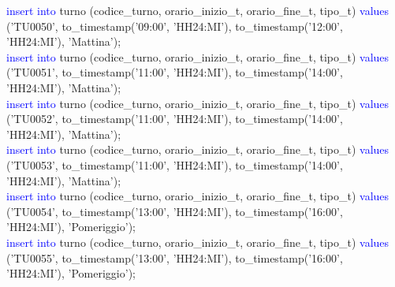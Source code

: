 \documentclass{article}
\begin{document}
\begin{flushleft}
{        \hspace*{0.5em}\textcolor{blue}{insert into} turno (codice\_turno, orario\_inizio\_t, orario\_fine\_t, tipo\_t) \textcolor{blue}{values} \hspace*{0.5em}('TU0050', to\_timestamp('09:00', 'HH24:MI'), to\_timestamp('12:00', 'HH24:MI'), \hspace*{0.5em}'Mattina'); \\
        \newpage
        \hspace*{0.5em}\textcolor{blue}{insert into} turno (codice\_turno, orario\_inizio\_t, orario\_fine\_t, tipo\_t) \textcolor{blue}{values} \hspace*{0.5em}('TU0051', to\_timestamp('11:00', 'HH24:MI'), to\_timestamp('14:00', 'HH24:MI'), \hspace*{0.5em}'Mattina'); \\
        \hspace*{0.5em}\textcolor{blue}{insert into} turno (codice\_turno, orario\_inizio\_t, orario\_fine\_t, tipo\_t) \textcolor{blue}{values} \hspace*{0.5em}('TU0052', to\_timestamp('11:00', 'HH24:MI'), to\_timestamp('14:00', 'HH24:MI'), \hspace*{0.5em}'Mattina'); \\
        \hspace*{0.5em}\textcolor{blue}{insert into} turno (codice\_turno, orario\_inizio\_t, orario\_fine\_t, tipo\_t) \textcolor{blue}{values} \hspace*{0.5em}('TU0053', to\_timestamp('11:00', 'HH24:MI'), to\_timestamp('14:00', 'HH24:MI'), \hspace*{0.5em}'Mattina'); \\
        \hspace*{0.5em}\textcolor{blue}{insert into} turno (codice\_turno, orario\_inizio\_t, orario\_fine\_t, tipo\_t) \textcolor{blue}{values} \hspace*{0.5em}('TU0054', to\_timestamp('13:00', 'HH24:MI'), to\_timestamp('16:00', 'HH24:MI'), \hspace*{0.5em}'Pomeriggio'); \\
        \hspace*{0.5em}\textcolor{blue}{insert into} turno (codice\_turno, orario\_inizio\_t, orario\_fine\_t, tipo\_t) \textcolor{blue}{values} \hspace*{0.5em}('TU0055', to\_timestamp('13:00', 'HH24:MI'), to\_timestamp('16:00', 'HH24:MI'), \hspace*{0.5em}'Pomeriggio'); \\
}
\end{flushleft}
\end{document}

